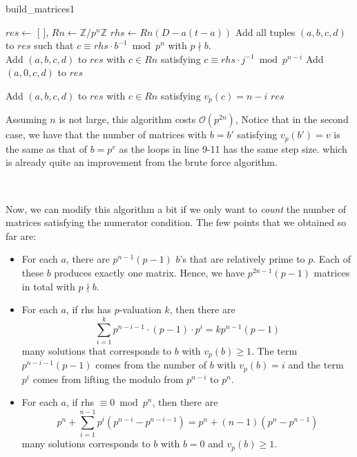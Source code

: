 \documentclass[letterpaper,12pt]{article}
\newcommand{\Z}{\mathbb{Z}}
\newcommand{\bigO}{\mathcal{O}}
\begin{document}
\begin{algorithm}[H]
\caption{build\_matrices1}
\begin{algorithmic}[1]
    \State $res \gets$ [ ], $Rn \gets \Z/p^n\Z$    
        \State $rhs \gets Rn(D - a(t-a))$
        \State Add all tuples $(a,b,c,d)$ to $res$ such that $c \equiv rhs \cdot b^{-1} \bmod p^n$ with $p \nmid b$. \\
        
                    \State Add $(a,b,c,d)$ to $res$ with $c \in Rn$ satisfying $c \equiv rhs \cdot j^{-1} \bmod p^{n-i}$
                \EndFor
            \EndFor
        \Else
                \State Add $(a,0,c,d)$ to $res$
            \EndFor

                \State Add $(a,b,c,d)$ to $res$ with $c \in Rn$ satisfying $v_p(c) = n-i$
            \EndFor
        \EndIf
    \EndFor
    \State \Return $res$
\EndFunction
\end{algorithmic}
\end{algorithm}

Assuming $n$ is not large, this algorithm costs $\bigO(p^{2n})$,
Notice that in the second case, we have that the number of matrices 
with $b = b'$ satisfying $v_p(b') = v$ is the same as that of $b = p^v$
as the loops in line 9-11 has the same step size.
which is already quite an improvement from the brute force algorithm.

\

Now, we can modify this algorithm a bit if we only want to \emph{count} the number of matrices
satisfying the numerator condition.
The few points that we obtained so far are:
\begin{itemize}
\item For each $a$, there are $p^{n-1}(p-1)$ $b$'s that are relatively prime to $p$.
Each of these $b$ produces exactly one matrix.
Hence, we have $p^{2n-1}(p-1)$ matrices in total with $p \nmid b$.
\item For each $a$, if rhs has $p$-valuation $k$, then there are 
\[
\sum_{i=1}^k p^{n-i-1} \cdot (p-1) \cdot p^i = k p^{n-1}(p-1)
\]
many solutions that corresponds to $b$ with $v_p(b) \geq 1$.
The term $p^{n-i-1}(p-1)$ comes from the number of $b$
with $v_p(b) = i$
and the term $p^i$ comes from lifting the modulo from $p^{n-i}$ to $p^n$.
\item For each $a$, if rhs $\equiv 0 \bmod p^n$, then there are 
\[
p^n + \sum_{i=1}^{n-1} p^i (p^{n-i} - p^{n-i-1})
= p^n + (n-1) (p^n - p^{n-1})
\]
many solutions corresponds to $b$ with $b = 0$ and $v_p(b) \geq 1$.
\end{itemize}
\end{document}
